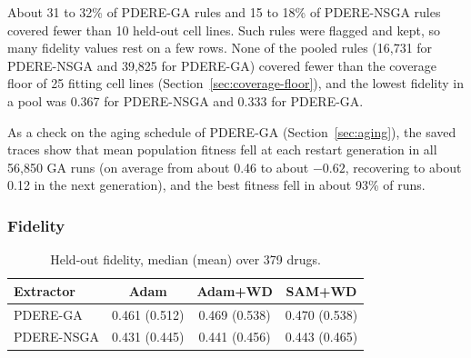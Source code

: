 About 31 to 32\% of PDERE-GA rules and 15 to 18\% of PDERE-NSGA rules covered fewer than 10 held-out cell lines. Such rules were flagged and kept, so many fidelity values rest on a few rows. None of the pooled rules (16,731 for PDERE-NSGA and 39,825 for PDERE-GA) covered fewer than the coverage floor of 25 fitting cell lines (Section~\ref{sec:coverage-floor}), and the lowest fidelity in a pool was 0.367 for PDERE-NSGA and 0.333 for PDERE-GA.

As a check on the aging schedule of PDERE-GA (Section~\ref{sec:aging}), the saved traces show that mean population fitness fell at each restart generation in all 56,850 GA runs (on average from about 0.46 to about $-0.62$, recovering to about 0.12 in the next generation), and the best fitness fell in about 93\% of runs.

\subsubsection{Fidelity}
\label{sec:fidelity-results}

\begin{table}[htbp]
  \centering
  \caption{Held-out fidelity, median (mean) over 379 drugs.}
  \label{tab:fidelity}
  \small
  \renewcommand{\arraystretch}{1.2}
  \begin{tabular}{@{}lccc@{}}
    \toprule
    \textbf{Extractor} & \textbf{Adam} & \textbf{Adam+WD} & \textbf{SAM+WD} \\
    \midrule
    PDERE-GA   & 0.461 (0.512) & 0.469 (0.538) & 0.470 (0.538) \\
    PDERE-NSGA & 0.431 (0.445) & 0.441 (0.456) & 0.443 (0.465) \\
    \bottomrule
  \end{tabular}
\end{table}

